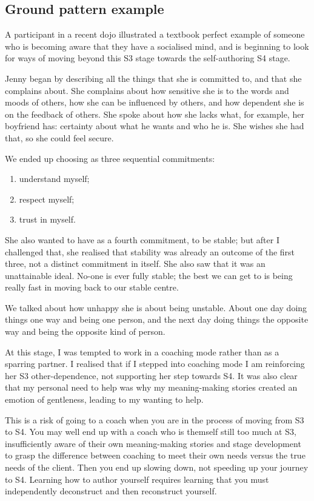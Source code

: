 \subsection{Ground pattern example}
A participant in a recent dojo illustrated a textbook perfect example of someone who is becoming aware that they have a socialised mind, and is beginning to look for ways of moving beyond this S3 stage towards the self-authoring S4 stage. 


\begin{longstoryblock}
Jenny began by describing all the things that she is committed to, and that she complains about. She complains about how sensitive she is to the words and moods of others, how she can be influenced by others, and how dependent she is on the feedback of others. She spoke about how she lacks what, for example, her boyfriend has: certainty about what he wants and who he is. She wishes she had that, so she could feel secure. 


We ended up choosing as three sequential commitments: 


\begin{enumerate}
\item understand myself;
\item respect myself;
\item trust in myself.
\end{enumerate}


She also wanted to have as a fourth commitment, to be stable; but after I challenged that, she realised that stability was already an outcome of the first three, not a distinct commitment in itself. She also saw that it was an unattainable ideal. No-one is ever fully stable; the best we can get to is being really fast in moving back to our stable centre.


We talked about how unhappy she is about being unstable. About one day doing things one way and being one person, and the next day doing things the opposite way and being the opposite kind of person.


At this stage, I was tempted to work in a coaching mode rather than as a sparring partner. I realised that if I stepped into coaching mode I am reinforcing her S3 other-dependence, not supporting her step towards S4. It was also clear that my personal need to help was why my meaning-making stories created an emotion of gentleness, leading to my wanting to help.


This is a risk of going to a coach when you are in the process of moving from S3 to S4. You may well end up with a coach who is themself still too much at S3, insufficiently aware of their own meaning-making stories and stage development to grasp the difference between coaching to meet their own needs versus the true needs of the client. Then you end up slowing down, not speeding up your journey to S4. Learning how to author yourself requires learning that you must independently deconstruct and then reconstruct yourself.



\end{longstoryblock}
